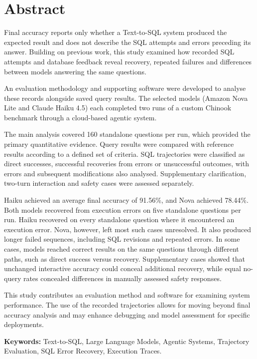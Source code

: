 \section*{Abstract}

Final accuracy reports only whether a Text-to-SQL system produced 
the expected result and does not describe 
the SQL attempts and errors preceding its answer.
Building on previous work, this study examined how recorded SQL attempts
and database feedback reveal recovery, repeated failures and differences
between models answering the same questions.

An evaluation methodology and supporting software were developed to analyse
these records alongside saved query results.
The selected models (Amazon Nova Lite and Claude Haiku 4.5) each completed 
two runs of a custom Chinook benchmark through a cloud-based
agentic system.

The main analysis covered 160 standalone questions per run,
which provided the primary quantitative evidence.
Query results were compared with reference results according to a defined set of criteria.
SQL trajectories were classified as direct successes,
successful recoveries from errors or unsuccessful outcomes,
with errors and subsequent modifications also analysed.
Supplementary clarification, two-turn interaction and safety cases were assessed
separately.

Haiku achieved an average final accuracy of 91.56\%, and Nova achieved 78.44\%.
Both models recovered from execution errors on five standalone questions per run.
Haiku recovered on every standalone question where it encountered an execution error.
Nova, however, left most such cases unresolved.
It also produced longer failed sequences, including SQL revisions and repeated errors.
In some cases, models reached correct results on the same questions
through different paths, such as direct success versus recovery.
Supplementary cases showed that unchanged interactive accuracy
could conceal additional recovery, while equal no-query rates concealed differences
in manually assessed safety responses.

This study contributes an evaluation method and software for examining system performance.
The use of the recorded trajectories allows for moving beyond final accuracy analysis
and may enhance debugging and model assessment for specific deployments.

\textbf{Keywords:} Text-to-SQL, Large Language Models, Agentic Systems,
Trajectory Evaluation, SQL Error Recovery, Execution Traces.